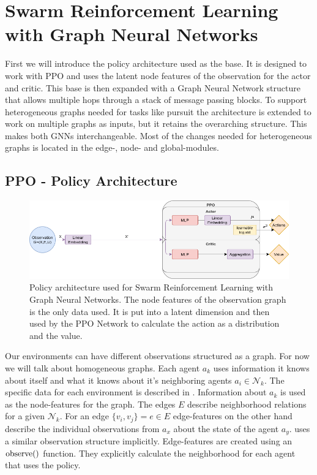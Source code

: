 
\chapter{Swarm Reinforcement Learning with Graph Neural Networks}
\label{ch:Architecture}
First we will introduce the policy architecture used as the base. It is designed to work with PPO and uses the latent node features of the observation for the actor and critic. This base is then expanded with a Graph Neural Network structure that allows multiple hops through a stack of message passing blocks. To support heterogeneous graphs needed for tasks like pursuit the architecture is extended to work on multiple graphs as inputs, but it retains the overarching structure. This makes both GNNs interchangeable. Most of the changes needed for heterogeneous graphs is located in the edge-, node- and global-modules.


\section{PPO - Policy Architecture}
\begin{figure}[htp]
    \centering
    \includegraphics[width=1.0\textwidth]{figures/PPO_no_message_passing.png}
    \hspace{1cm}   
    \caption{Policy architecture used for Swarm Reinforcement Learning with Graph Neural Networks. The node features of the observation graph is the only data used. It is put into a latent dimension and then used by the PPO Network to calculate the action as a distribution and the value.}
    \label{fig:PPO_no_message_passing}
\end{figure}
Our environments can have different observations structured as a graph. For now we will talk about homogeneous graphs. Each agent $a_k$ uses information it knows about itself and what it knows about it's neighboring agents $a_i \in \mathcal{N}_k$. The specific data for each environment is described in . Information about $a_k$ is used as the node-features for the graph. The edges $E$ describe neighborhood relations for a given $\mathcal{N}_k$. For an edge $\{v_i,v_j\} = e \in E$ edge-features on the other hand describe the individual observations from $a_x$ about the state of the agent $a_y$.  uses a similar observation structure implicitly. Edge-features are created using an $\textup{observe()}$ function. They explicitly calculate the neighborhood for each agent that uses the policy. \par

